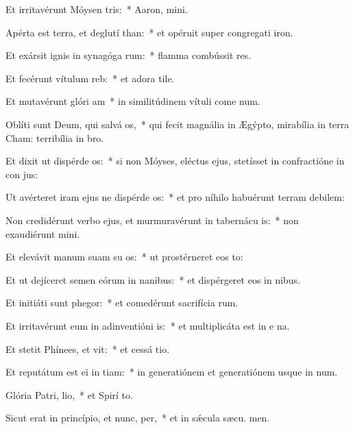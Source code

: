 \item Et irritavérunt Móysen  tris:~* Aaron,  mini.
\item Apérta est terra, et deglutí than:~* et opéruit super congregati iron.
\item Et exársit ignis in synagóga rum:~* flamma combússit res.
\item Et fecérunt vítulum  reb:~* et adora tile.
\item Et mutavérunt glóri am~* in similitúdinem vítuli come num.
\item Oblíti sunt Deum, qui salvá os,~* qui fecit magnália in Ægýpto, mirabília in terra Cham: terribília in  bro.
\item Et dixit ut dispérde os:~* si non Móyses, eléctus ejus, stetísset in confractióne in con jus:
\item Ut avérteret iram ejus ne dispérde os:~* et pro níhilo habuérunt terram debilem:
\item Non credidérunt verbo ejus, et murmuravérunt in tabernácu is:~* non exaudiérunt  mini.
\item Et elevávit manum suam su os:~* ut prostérneret eos  to:
\item Et ut dejíceret semen eórum in nanibus:~* et dispérgeret eos in nibus.
\item Et initiáti sunt phegor:~* et comedérunt sacrifícia rum.
\item Et irritavérunt eum in adinventióni is:~* et multiplicáta est in e na.
\item Et stetit Phínees, et vit:~* et cessá tio.
\item Et reputátum est ei in tiam:~* in generatiónem et generatiónem usque in num.
\item Glória Patri,  lio,~* et Spirí to.
\item Sicut erat in princípio, et nunc,  per,~* et in sǽcula sæcu. men.
